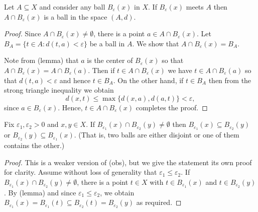 \begin{lemma}
Let \( A \subseteq X \) and consider any ball \(B_{\varepsilon } (x) \) in \( X \). If \( B_{\varepsilon } (x) \) meets \( A \) then \( A \cap B_{\varepsilon } (x) \) is a ball in the space \( (A, d) \).
\end{lemma}
\begin{proof}
Since \( A \cap B_{\varepsilon } (x) \neq \emptyset  \), there is a point \( a \in A \cap B_{\varepsilon } (x) \). Let \( B_{A} = \{ t \in A : d(t,a) < \varepsilon  \}  \) be a ball in \( A \). We show that \( A \cap B_{\varepsilon } (x) = B_{A}  \).

Note from (lemma) that \( a \) is the center of \( B_{\varepsilon } (x) \) so that \( A \cap B_{\varepsilon } (x) = A \cap B_{\varepsilon } (a) \). Then if \( t \in A \cap B_{\varepsilon } (x) \) we have \( t \in A \cap B_{\varepsilon } (a) \) so that \( d(t, a) < \varepsilon  \) and hence \( t \in B_{A} \). On the other hand, if \( t \in B_{A}  \) then from the strong triangle inequality we obtain \[ d(x, t) \leq \max \{ d(x,a), d(a,t) \} < \varepsilon , \] since \( a \in B_{\varepsilon } (x) \). Hence, \( t \in A \cap B_{\varepsilon } (x) \) completes the proof.
\end{proof}
\begin{comment}
Since \( A \cap B \neq \emptyset \) there is a point \( a \in A \cap B \). Write \( B = B_{\varepsilon } (x) \) for some \( x \in X \) and \( \varepsilon > 0 \). To show that \( A \cap B \) is a ball in \( A \), we must find a radius \( r > 0 \) such that for every \( t \in A \cap B\), \( d(a,t) < r \). Set \( r = \varepsilon  \) and fix \( t \in A \cap B \). Then \( a, t \in B \) so that \( d(a,x) < \varepsilon  \) and \( d(t,x) < \varepsilon  \). Using the strong triangle inequality, \[ d(a,t) \leq \max \{ d(a,x) , d(t,x) \} < \varepsilon = r. \] Therefore, \( A \cap B \) is a ball in \( A \).
\end{comment}
\begin{lemma}
Fix \( \varepsilon_1, \varepsilon_2 > 0 \) and \( x, y \in X \). If \( B_{\varepsilon_1} (x) \cap B_{\varepsilon_2}(y) \neq \emptyset  \) then \( B_{\varepsilon_1} (x) \subseteq B_{\varepsilon_2} (y) \) or \( B_{\varepsilon_{2} }(y) \subseteq B_{\varepsilon_1} (x)  \). (That is, two balls are either disjoint or one of them contains the other.)
\end{lemma}
\begin{proof}
This is a weaker version of (obs), but we give the statement its own proof for clarity. Assume without loss of generality that \( \varepsilon_1 \leq \varepsilon_2 \). If \( B_{\varepsilon_1} (x) \cap B_{\varepsilon_2} (y) \neq \emptyset \), there is a point \( t \in X \) with \( t \in B_{\varepsilon_1}(x) \) and \( t \in  B_{\varepsilon_2} (y)  \). By (lemma) and since \( \varepsilon_1 \leq \varepsilon_2 \), we obtain \( B_{\varepsilon_1} (x) = B_{\varepsilon_1} (t) \subseteq B_{\varepsilon_2} (t) = B_{\varepsilon_2} (y) \) as required.
\end{proof}
